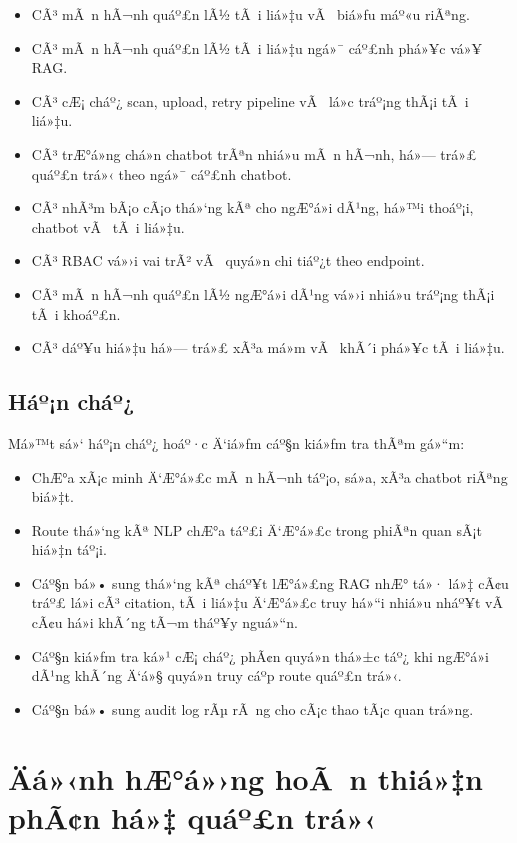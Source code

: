 ﻿\documentclass[12pt,a4paper]{report}
\begin{document}
\begin{itemize}
    \item CÃ³ mÃ n hÃ¬nh quáº£n lÃ½ tÃ i liá»‡u vÃ  biá»ƒu máº«u riÃªng.
    \item CÃ³ mÃ n hÃ¬nh quáº£n lÃ½ tÃ i liá»‡u ngá»¯ cáº£nh phá»¥c vá»¥ RAG.
    \item CÃ³ cÆ¡ cháº¿ scan, upload, retry pipeline vÃ  lá»c tráº¡ng thÃ¡i tÃ i liá»‡u.
    \item CÃ³ trÆ°á»ng chá»n chatbot trÃªn nhiá»u mÃ n hÃ¬nh, há»— trá»£ quáº£n trá»‹ theo ngá»¯ cáº£nh chatbot.
    \item CÃ³ nhÃ³m bÃ¡o cÃ¡o thá»‘ng kÃª cho ngÆ°á»i dÃ¹ng, há»™i thoáº¡i, chatbot vÃ  tÃ i liá»‡u.
    \item CÃ³ RBAC vá»›i vai trÃ² vÃ  quyá»n chi tiáº¿t theo endpoint.
    \item CÃ³ mÃ n hÃ¬nh quáº£n lÃ½ ngÆ°á»i dÃ¹ng vá»›i nhiá»u tráº¡ng thÃ¡i tÃ i khoáº£n.
    \item CÃ³ dáº¥u hiá»‡u há»— trá»£ xÃ³a má»m vÃ  khÃ´i phá»¥c tÃ i liá»‡u.
\end{itemize}

\subsection{Háº¡n cháº¿}

Má»™t sá»‘ háº¡n cháº¿ hoáº·c Ä‘iá»ƒm cáº§n kiá»ƒm tra thÃªm gá»“m:

\begin{itemize}
    \item ChÆ°a xÃ¡c minh Ä‘Æ°á»£c mÃ n hÃ¬nh táº¡o, sá»­a, xÃ³a chatbot riÃªng biá»‡t.
    \item Route thá»‘ng kÃª NLP chÆ°a táº£i Ä‘Æ°á»£c trong phiÃªn quan sÃ¡t hiá»‡n táº¡i.
    \item Cáº§n bá»• sung thá»‘ng kÃª cháº¥t lÆ°á»£ng RAG nhÆ° tá»· lá»‡ cÃ¢u tráº£ lá»i cÃ³ citation, tÃ i liá»‡u Ä‘Æ°á»£c truy há»“i nhiá»u nháº¥t vÃ  cÃ¢u há»i khÃ´ng tÃ¬m tháº¥y nguá»“n.
    \item Cáº§n kiá»ƒm tra ká»¹ cÆ¡ cháº¿ phÃ¢n quyá»n thá»±c táº¿ khi ngÆ°á»i dÃ¹ng khÃ´ng Ä‘á»§ quyá»n truy cáº­p route quáº£n trá»‹.
    \item Cáº§n bá»• sung audit log rÃµ rÃ ng cho cÃ¡c thao tÃ¡c quan trá»ng.
\end{itemize}

\section{Äá»‹nh hÆ°á»›ng hoÃ n thiá»‡n phÃ¢n há»‡ quáº£n trá»‹}
\end{document}
